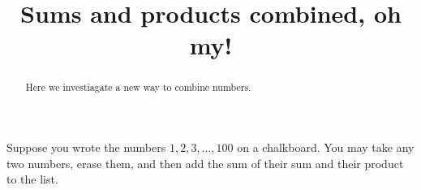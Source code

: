 \documentclass{ximera}
\title{Sums and products combined, oh my!}
\begin{document}
\begin{abstract}
Here we investiagate a new way to combine numbers.
\end{abstract}
\maketitle

\begin{question}
Suppose you wrote the numbers $1,2,3,\dots,100$ on a chalkboard. You
may take any two numbers, erase them, and then add the sum of their
sum and their product to the list.

\end{question}
\end{document}
